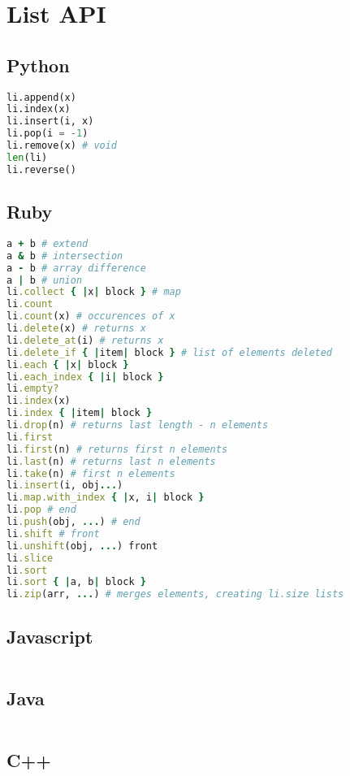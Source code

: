 \documentclass{article}
\begin{document}
\section{List API}
\subsection{Python}
\begin{lstlisting}[language=Python]
li.append(x)
li.index(x)
li.insert(i, x)
li.pop(i = -1)
li.remove(x) # void
len(li)
li.reverse()
\end{lstlisting}

\subsection{Ruby}
\begin{lstlisting}[language=Ruby]
a + b # extend
a & b # intersection
a - b # array difference
a | b # union
li.collect { |x| block } # map
li.count
li.count(x) # occurences of x
li.delete(x) # returns x
li.delete_at(i) # returns x
li.delete_if { |item| block } # list of elements deleted
li.each { |x| block }
li.each_index { |i| block }
li.empty?
li.index(x)
li.index { |item| block }
li.drop(n) # returns last length - n elements
li.first
li.first(n) # returns first n elements
li.last(n) # returns last n elements
li.take(n) # first n elements
li.insert(i, obj...)
li.map.with_index { |x, i| block }
li.pop # end
li.push(obj, ...) # end
li.shift # front
li.unshift(obj, ...) front
li.slice
li.sort
li.sort { |a, b| block }
li.zip(arr, ...) # merges elements, creating li.size lists
\end{lstlisting}

\subsection{Javascript}
\begin{lstlisting}

\end{lstlisting}

\subsection{Java}
\begin{lstlisting}[language=Java]

\end{lstlisting}

\subsection{C++}
\begin{lstlisting}[language=C++]

\end{lstlisting}
\end{document}
